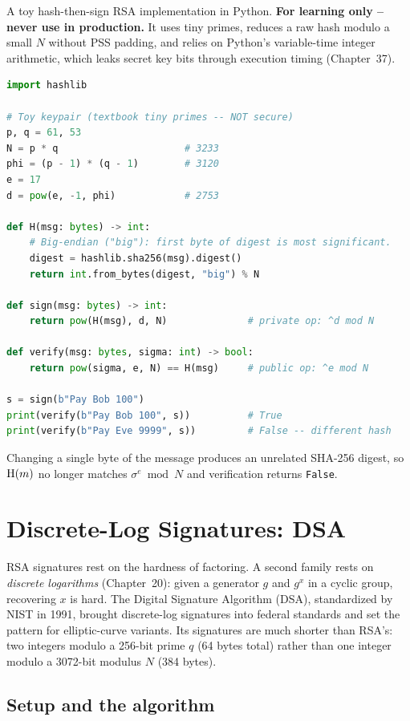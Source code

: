 \begin{implementbox}
A toy hash-then-sign RSA implementation in Python. \textbf{For learning only -- never use in production.} It uses tiny primes, reduces a raw hash modulo a small $N$ without PSS padding, and relies on Python's variable-time integer arithmetic, which leaks secret key bits through execution timing (Chapter~37).
\begin{lstlisting}[language=Python]
import hashlib

# Toy keypair (textbook tiny primes -- NOT secure)
p, q = 61, 53
N = p * q                      # 3233
phi = (p - 1) * (q - 1)        # 3120
e = 17
d = pow(e, -1, phi)            # 2753

def H(msg: bytes) -> int:
    # Big-endian ("big"): first byte of digest is most significant.
    digest = hashlib.sha256(msg).digest()
    return int.from_bytes(digest, "big") % N

def sign(msg: bytes) -> int:
    return pow(H(msg), d, N)              # private op: ^d mod N

def verify(msg: bytes, sigma: int) -> bool:
    return pow(sigma, e, N) == H(msg)     # public op: ^e mod N

s = sign(b"Pay Bob 100")
print(verify(b"Pay Bob 100", s))          # True
print(verify(b"Pay Eve 9999", s))         # False -- different hash
\end{lstlisting}
Changing a single byte of the message produces an unrelated SHA-256 digest, so $\operatorname{H}(m)$ no longer matches $\sigma^e \bmod N$ and verification returns \texttt{False}.
\end{implementbox}

\section{Discrete-Log Signatures: DSA}
\label{ch22:dsa}

RSA signatures rest on the hardness of factoring. A second family rests on
\emph{discrete logarithms} (Chapter~20): given a generator $g$ and $g^x$ in a cyclic group, recovering
$x$ is hard. The Digital Signature Algorithm (DSA), standardized by NIST in 1991, brought
discrete-log signatures into federal standards and set the pattern for elliptic-curve variants.
Its signatures are much shorter than RSA's: two integers modulo a 256-bit prime $q$ (64 bytes total) rather than one integer modulo a 3072-bit modulus $N$ (384 bytes).

\subsection{Setup and the algorithm}
\label{ch22:dsa-algo}

